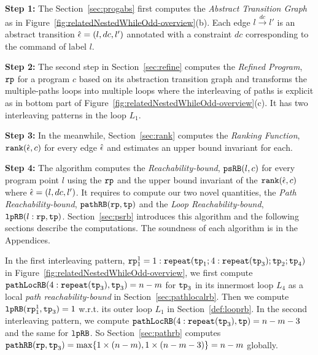 \textbf{Step 1: }
The Section~\ref{sec:progabs} first 
computes the \emph{Abstract Transition Graph} as in Figure~\ref{fig:relatedNestedWhileOdd-overview}(b).
Each edge $l \xrightarrow{dc} l'$ is an abstract transition $\hat{\mathtt{\epsilon}{}} = (l, dc, l')$ annotated with a constraint $dc$ corresponding to the command of label $l$.

\textbf{Step 2: }
The second step in Section~\ref{sec:refine}
computes the \emph{Refined Program}, $\mathtt{rp}$ for a program $c$ based on 
its abstraction transition graph and transforms the multiple-paths loops
into multiple loops where
the interleaving of paths is explicit as in bottom part of Figure~\ref{fig:relatedNestedWhileOdd-overview}(c).
It has two interleaving patterns in the loop $L_1$.

\textbf{Step 3: }
In the meanwhile, Section~\ref{sec:rank} computes the \emph{Ranking Function}, $\mathtt{rank}(\hat{\mathtt{\epsilon}{}}, c)$ 
for every edge $\hat{\mathtt{\epsilon}{}}$ 
and estimates an upper bound invariant for each.

\textbf{Step 4: }
The algorithm computes the \emph{Reachability-bound}, $\mathtt{psRB}(l, c)$ for every program point $l$ using the $\mathtt{rp}$ and the upper bound invariant of the $\mathtt{rank}(\hat{\mathtt{\epsilon}{}}, c)$ where $\hat{\mathtt{\epsilon}{}} = (l,dc,l')$.
It requires to compute our two novel quantities, the \emph{Path Reachability-bound}, $\mathtt{pathRB}(\mathtt{rp}, \mathtt{tp})$ and the \emph{Loop Reachability-bound}, $\mathtt{lpRB}(l: \mathtt{rp}, \mathtt{tp})$.
Section~\ref{sec:psrb} introduces this algorithm and the following sections describe the computations. 
The soundness of each algorithm is in the Appendices.

In the first interleaving pattern, $\mathtt{rp}_1^1 = 1: \mathtt{repeat}(\mathtt{tp}_1; 4:\mathtt{repeat}(\mathtt{tp}_3); \mathtt{tp}_2; \mathtt{tp}_4)$ in Figure~\ref{fig:relatedNestedWhileOdd-overview},
we first compute $\mathtt{pathLocRB}(4:\mathtt{repeat}(\mathtt{tp}_3), \mathtt{tp}_3) = n - m$ for $\mathtt{tp}_3$ in its innermost loop $L_4$ as a local \emph{path reachability-bound} in Section~\ref{sec:pathlocalrb}.
Then we compute $\mathtt{lpRB}(\mathtt{rp}_1^1, \mathtt{tp}_3) = 1$ w.r.t. its outer loop $L_1$ in Section~\ref{def:looprb}. In the second interleaving pattern, we compute $\mathtt{pathLocRB}(4:\mathtt{repeat}(\mathtt{tp}_3), \mathtt{tp}) = n - m - 3$ and the same for $\mathtt{lpRB}$.
So Section~\ref{sec:pathrb} computes $\mathtt{pathRB}(\mathtt{rp}, \mathtt{tp}_3) = \max\{ 1 \times (n - m), 1 \times (n - m - 3) \} = n - m$ globally.

